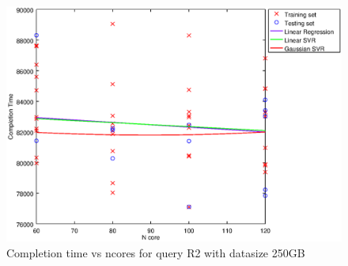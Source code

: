 
\begin {figure}[hbtp]
\centering
\includegraphics[width=\textwidth]{output/R2_250_LINEAR_NCORE/plot_R2_250_bestmodels.eps}
\caption{Completion time vs ncores for query R2 with datasize 250GB}
\label{fig:coreonly_linear_R2_250}
\end {figure}
